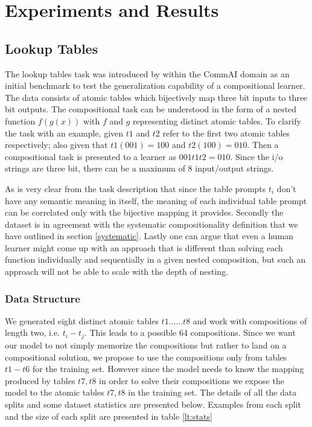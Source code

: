\chapter{Experiments and Results}\label{Chapter:experiments}


\section{Lookup Tables} \label{datasets:lt}

The lookup tables task was introduced by \cite{Liska2018} within the CommAI domain \citep{Baroni2017} as an initial benchmark to test the generalization capability of a compositional learner. The data consists of atomic tables which bijectively map three bit inputs to three bit outputs. The compositional task can be understood in the form of a nested function $f(g(x))$ with $f$ and $g$ representing distinct atomic tables. To clarify the task with an example, given $t1$ and $t2$ refer to the first two atomic tables respectively; also given that $t1(001) = 100$ and $t2(100) = 010$. Then a compositional task is presented to a learner as $001 t1 t2 = 010$. Since the i/o strings are three bit, there can be a maximum of 8 input/output strings.

As is very clear from the task description that since the table prompts $t_i$ don't have any semantic meaning in itself, the meaning of each individual table prompt can be correlated only with the bijective mapping it provides. Secondly the dataset is in agreement with the systematic compositionality definition that we have outlined in section \ref{systematic}. Lastly one can argue that even a human learner might come up with an approach that is different than solving each function individually and sequentially in a given nested composition, but such an approach will not be able to scale with the depth of nesting.

\subsection{Data Structure}\label{lt:splits}
We generated eight distinct atomic tables $t1......t8$ and work with compositions of length two, i.e. $t_i - t_j$. This leads to a possible 64 compositions. Since we want our model to not simply memorize the compositions but rather to land on a compositional solution, we propose to use the compositions only from tables $t1 - t6$ for the training set. However since the model needs to know the mapping produced by tables $t7, t8$ in order to solve their compositions we expose the model to the atomic tables $t7, t8$ in the training set. The details of all the data splits and some dataset statistics are presented below. Examples from each split and the size of each split are presented in table \ref{lt:stats}

